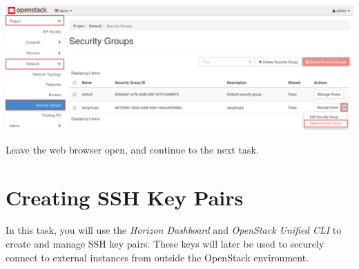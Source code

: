 \documentclass[letterpaper, 12pt]{article}
\begin{document}
\begin{enumerate}
\begin{labstep}
        \begin{center}
            \includegraphics[width=\linewidth]{images/part6/step23.png}
        \end{center}
    \end{labstep}

    \begin{labstep}
        Leave the web browser open, and continue to the next task.
    \end{labstep}

\end{enumerate}

\section{Creating SSH Key Pairs}\label{sec:creating-ssh-key-pairs}
In this task, you will use the \textit{Horizon Dashboard} and \textit{OpenStack Unified CLI} to create and manage SSH key pairs.
These keys will later be used to securely connect to external instances from outside the OpenStack environment.
\end{document}
